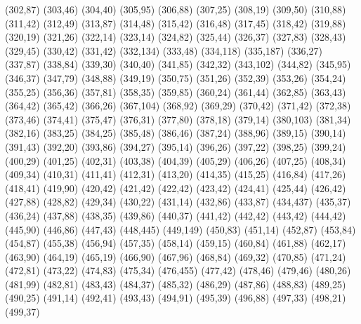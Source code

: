 (302,87)
(303,46)
(304,40)
(305,95)
(306,88)
(307,25)
(308,19)
(309,50)
(310,88)
(311,42)
(312,49)
(313,87)
(314,48)
(315,42)
(316,48)
(317,45)
(318,42)
(319,88)
(320,19)
(321,26)
(322,14)
(323,14)
(324,82)
(325,44)
(326,37)
(327,83)
(328,43)
(329,45)
(330,42)
(331,42)
(332,134)
(333,48)
(334,118)
(335,187)
(336,27)
(337,87)
(338,84)
(339,30)
(340,40)
(341,85)
(342,32)
(343,102)
(344,82)
(345,95)
(346,37)
(347,79)
(348,88)
(349,19)
(350,75)
(351,26)
(352,39)
(353,26)
(354,24)
(355,25)
(356,36)
(357,81)
(358,35)
(359,85)
(360,24)
(361,44)
(362,85)
(363,43)
(364,42)
(365,42)
(366,26)
(367,104)
(368,92)
(369,29)
(370,42)
(371,42)
(372,38)
(373,46)
(374,41)
(375,47)
(376,31)
(377,80)
(378,18)
(379,14)
(380,103)
(381,34)
(382,16)
(383,25)
(384,25)
(385,48)
(386,46)
(387,24)
(388,96)
(389,15)
(390,14)
(391,43)
(392,20)
(393,86)
(394,27)
(395,14)
(396,26)
(397,22)
(398,25)
(399,24)
(400,29)
(401,25)
(402,31)
(403,38)
(404,39)
(405,29)
(406,26)
(407,25)
(408,34)
(409,34)
(410,31)
(411,41)
(412,31)
(413,20)
(414,35)
(415,25)
(416,84)
(417,26)
(418,41)
(419,90)
(420,42)
(421,42)
(422,42)
(423,42)
(424,41)
(425,44)
(426,42)
(427,88)
(428,82)
(429,34)
(430,22)
(431,14)
(432,86)
(433,87)
(434,437)
(435,37)
(436,24)
(437,88)
(438,35)
(439,86)
(440,37)
(441,42)
(442,42)
(443,42)
(444,42)
(445,90)
(446,86)
(447,43)
(448,445)
(449,149)
(450,83)
(451,14)
(452,87)
(453,84)
(454,87)
(455,38)
(456,94)
(457,35)
(458,14)
(459,15)
(460,84)
(461,88)
(462,17)
(463,90)
(464,19)
(465,19)
(466,90)
(467,96)
(468,84)
(469,32)
(470,85)
(471,24)
(472,81)
(473,22)
(474,83)
(475,34)
(476,455)
(477,42)
(478,46)
(479,46)
(480,26)
(481,99)
(482,81)
(483,43)
(484,37)
(485,32)
(486,29)
(487,86)
(488,83)
(489,25)
(490,25)
(491,14)
(492,41)
(493,43)
(494,91)
(495,39)
(496,88)
(497,33)
(498,21)
(499,37)
